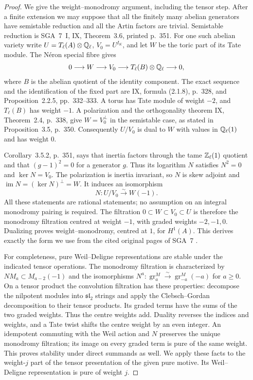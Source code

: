 \begin{proof}
We give the weight--monodromy argument, including the tensor step.
After a finite extension we may suppose that all the finitely many
abelian generators have semistable reduction and all the Artin factors
are trivial.  Semistable reduction is SGA~7~I, IX, Theorem~3.6, printed
p.~351.  For one such abelian variety write
$U=T_\ell(A)\otimes\mathbb Q_\ell$, $V_0=U^{I_K}$, and let $W$ be the
toric part of its Tate module.  The N\'eron special fibre gives
\[
 0\longrightarrow W\longrightarrow V_0
       \longrightarrow T_\ell(B)\otimes\mathbb Q_\ell\longrightarrow0,
\]
where $B$ is the abelian quotient of the identity component.  The exact
sequence and the identification of the fixed part are IX, formula
(2.1.8), p.~328, and Proposition~2.2.5, pp.~332--333.  A torus has Tate
module of weight $-2$, and $T_\ell(B)$ has weight $-1$.  A polarization
and the orthogonality theorem IX, Theorem~2.4, p.~338, give
$W=V_0^\perp$ in the semistable case, as stated in Proposition~3.5,
p.~350.  Consequently $U/V_0$ is dual to $W$ with values in
$\mathbb Q_\ell(1)$ and has weight $0$.

Corollary~3.5.2, p.~351, says that inertia factors through the tame
$\mathbb Z_\ell(1)$ quotient and that $(g-1)^2=0$ for a generator $g$.
Thus its logarithm $N$ satisfies $N^2=0$ and $\ker N=V_0$.
The polarization is inertia invariant, so $N$ is skew adjoint and
$\operatorname{im}N=(\ker N)^\perp=W$.  It induces an isomorphism
\[
 N:U/V_0\xrightarrow{\sim}W(-1).
\]
All these statements are rational statements; no assumption on an
integral monodromy pairing is required.  The filtration
$0\subset W\subset V_0\subset U$ is therefore the monodromy
filtration centred at weight $-1$, with graded weights $-2,-1,0$.
Dualizing proves weight--monodromy, centred at $1$, for $H^1(A)$.
This derives exactly the form we use from the cited original pages
of SGA~7 \citep{c_sga7}.

For completeness, pure Weil--Deligne representations are stable under
the indicated tensor operations.  The monodromy filtration is
characterized by $NM_a\subset M_{a-2}(-1)$ and the isomorphisms
$N^a:\operatorname{gr}_a^M\xrightarrow{\sim}
\operatorname{gr}_{-a}^M(-a)$ for $a\geq0$.  On a tensor product
the convolution filtration has these properties: decompose the
nilpotent modules into $\mathfrak{sl}_2$ strings and apply the
Clebsch--Gordan decomposition to their tensor products.  Its graded
terms have the sums of the two graded weights.  Thus the centre
weights add.  Duality reverses the indices and weights, and a Tate
twist shifts the centre weight by an even integer.  An idempotent
commuting with the Weil action and $N$ preserves the unique
monodromy filtration; its image on every graded term is pure of the
same weight.  This proves stability under direct summands as well.
We apply these facts to the weight-$j$ part of the tensor presentation
of the given pure motive.  Its Weil--Deligne representation is pure
of weight $j$.


\end{proof}
